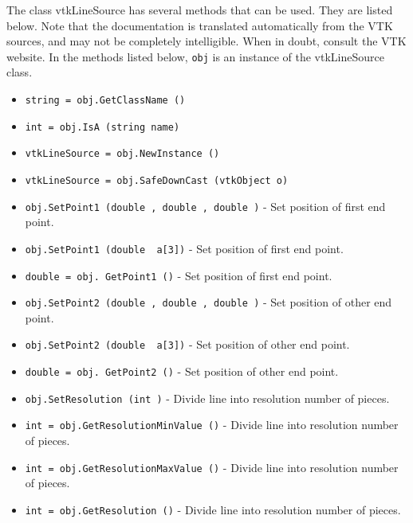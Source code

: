 The class vtkLineSource has several methods that can be used.
  They are listed below.
Note that the documentation is translated automatically from the VTK sources,
and may not be completely intelligible.  When in doubt, consult the VTK website.
In the methods listed below, \verb|obj| is an instance of the vtkLineSource class.
\begin{itemize}
\item  \verb|string = obj.GetClassName ()|

\item  \verb|int = obj.IsA (string name)|

\item  \verb|vtkLineSource = obj.NewInstance ()|

\item  \verb|vtkLineSource = obj.SafeDownCast (vtkObject o)|

\item  \verb|obj.SetPoint1 (double , double , double )| -  Set position of first end point.

\item  \verb|obj.SetPoint1 (double  a[3])| -  Set position of first end point.

\item  \verb|double = obj. GetPoint1 ()| -  Set position of first end point.

\item  \verb|obj.SetPoint2 (double , double , double )| -  Set position of other end point.

\item  \verb|obj.SetPoint2 (double  a[3])| -  Set position of other end point.

\item  \verb|double = obj. GetPoint2 ()| -  Set position of other end point.

\item  \verb|obj.SetResolution (int )| -  Divide line into resolution number of pieces.

\item  \verb|int = obj.GetResolutionMinValue ()| -  Divide line into resolution number of pieces.

\item  \verb|int = obj.GetResolutionMaxValue ()| -  Divide line into resolution number of pieces.

\item  \verb|int = obj.GetResolution ()| -  Divide line into resolution number of pieces.

\end{itemize}
